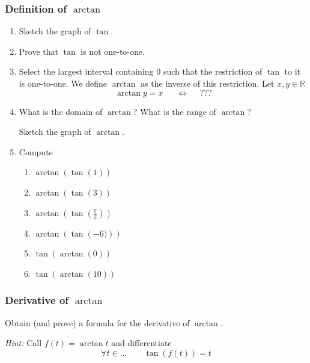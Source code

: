\documentclass[14pt]{beamer}
\begin{document}
\begin{frame}[t]
	\fontsize{13}{13}\selectfont
	\frametitle{Definition of $\arctan$}

	\begin{enumerate}
		\item Sketch the graph of $\tan$.

		\item Prove that $\tan$ is not one-to-one.

		\item Select the largest interval containing $0$ such that the restriction of
			$\tan$ to it is one-to-one. We define $\arctan$ as the inverse of this
			restriction. \quad Let $x, y \in \mathbb{R}$
			\[
				\arctan y = x \; \quad \; \iff \; \quad ???
			\]

		\item What is the domain of $\displaystyle \arctan$? What is the range of
			$\displaystyle \arctan$?

			Sketch the graph of $\arctan$.

		\item Compute
			\begin{multicols}{2}
				\begin{enumerate}
					\item $\displaystyle \arctan \left( \tan \left( 1 \right) \right)$

					\item $\displaystyle \arctan \left( \tan \left( 3\right) \right)$

					\item $\displaystyle \arctan \left( \tan \left( \frac{\pi}{2}\right) \right
						)$

					\item $\displaystyle \arctan \left( \tan \left( -6)\right) \right)$

					\item $\displaystyle \tan \left( \arctan \left( 0\right) \right)$

					\item $\displaystyle \tan \left( \arctan \left( 10\right) \right)$
				\end{enumerate}
			\end{multicols}
	\end{enumerate}
\end{frame}

\begin{frame}[t]
	\frametitle{Derivative of $\arctan$}

	\begin{block}{}
		Obtain (and prove) a formula for the derivative of $\arctan$.
	\end{block}

	\emph{Hint:} Call $\displaystyle f(t) = \arctan t$ and differentiate
	\[
		\forall t \in \ldots \quad \quad \tan ( f(t)) = t
	\]
\end{frame}
\end{document}
